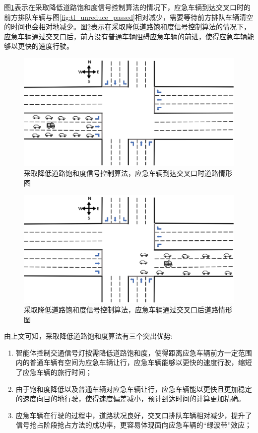 图\ref{fig:tl_reduce}表示在采取降低道路饱和度信号控制算法的情况下，应急车辆到达交叉口时的前方排队车辆与图\ref{fig:tl_unreduce_passed}相对减少，需要等待前方排队车辆清空的时间也会相对地减少。图\ref{fig:tl_reduce_passed}表示在采取降低道路饱和度信号控制算法的情况下，应急车辆通过交叉口后，前方没有普通车辆阻碍应急车辆的前进，使得应急车辆能够以更快的速度行驶。


\begin{figure}[H]
	\centering
	\includegraphics[width=\textwidth]{figures/tl_reduce.png}
	\caption{采取降低道路饱和度信号控制算法，应急车辆到达交叉口时道路情形图}
	\label{fig:tl_reduce}
\end{figure}

\begin{figure}[H]
	\centering
	\includegraphics[width=\textwidth]{figures/tl_reduce_passed.png}
	\caption{采取降低道路饱和度信号控制算法，应急车辆通过交叉口后道路情形图}
	\label{fig:tl_reduce_passed}
\end{figure}

由上文可知，采取降低道路饱和度算法有三个突出优势:
\begin{enumerate}
	\item 智能体控制交通信号灯按需降低道路饱和度，使得距离应急车辆前方一定范围内的普通车辆有空间为应急车辆让行，应急车辆能够以更快的速度行驶，缩短了应急车辆的旅行时间；
	\item 由于饱和度降低以及普通车辆对应急车辆让行，应急车辆能以更快且更加稳定的速度向目的地行驶，使得速度偏差减小，预计到达时间的计算更加精确。
	\item 应急车辆在行驶的过程中，道路状况良好，交叉口排队车辆相对减少，提升了信号抢占阶段抢占方法的成功率，更容易体现面向应急车辆的“绿波带”效应；
	
\end{enumerate}

